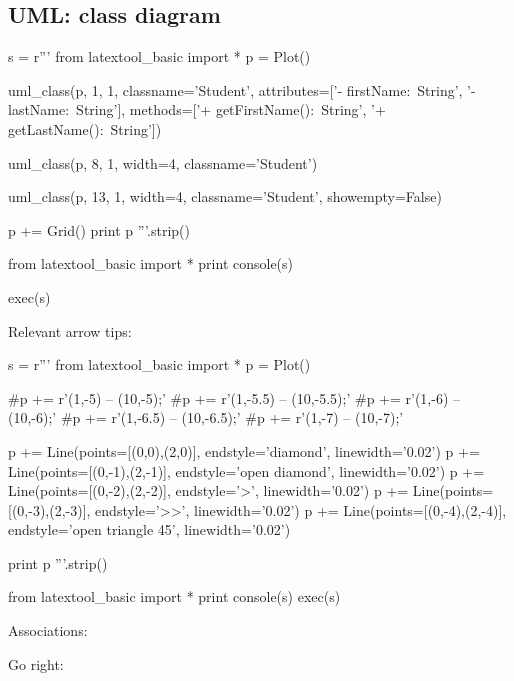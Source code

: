\subsection{UML: class diagram}

\begin{python}
s = r'''
from latextool_basic import *
p = Plot()
    
uml_class(p, 1, 1,
             classname='Student',
             attributes=['- firstName:\ String',
                         '- lastName:\ String'],
             methods=['+ getFirstName():\ String',
                      '+ getLastName():\ String'])

uml_class(p, 8, 1,
             width=4,
             classname='Student')

uml_class(p, 13, 1,
             width=4,
             classname='Student',
             showempty=False)

p += Grid()
print p
'''.strip()

from latextool_basic import *
print console(s)

exec(s)
\end{python}


\newpage
Relevant arrow tips:
\begin{python}
s = r'''
from latextool_basic import *
p = Plot()
    
#p += r'\draw[->>] (1,-5) -- (10,-5);'
#p += r'\draw[->] (1,-5.5) -- (10,-5.5);'
#p += r'\draw[-diamond] (1,-6) -- (10,-6);'
#p += r' (1,-6.5) -- (10,-6.5);'
#p += r' (1,-7) -- (10,-7);'


p += Line(points=[(0,0),(2,0)], endstyle='diamond', linewidth='0.02')
p += Line(points=[(0,-1),(2,-1)], endstyle='open diamond', linewidth='0.02')
p += Line(points=[(0,-2),(2,-2)], endstyle='>', linewidth='0.02')
p += Line(points=[(0,-3),(2,-3)], endstyle='>>', linewidth='0.02')
p += Line(points=[(0,-4),(2,-4)], endstyle='open triangle 45', linewidth='0.02')

print p
'''.strip()

from latextool_basic import *
print console(s)
exec(s)
\end{python}


\newpage
Associations:

Go right:

